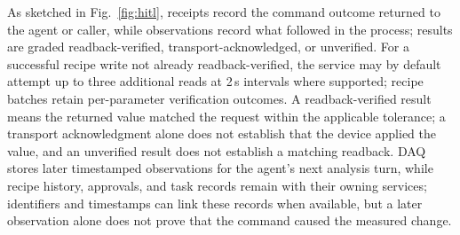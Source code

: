As sketched in Fig.~\ref{fig:hitl}, receipts record the command outcome returned to the agent or caller, while observations record what followed in the process; results are graded readback-verified, transport-acknowledged, or unverified. For a successful recipe write not already readback-verified, the service may by default attempt up to three additional reads at 2\,s intervals where supported; recipe batches retain per-parameter verification outcomes. A readback-verified result means the returned value matched the request within the applicable tolerance; a transport acknowledgment alone does not establish that the device applied the value, and an unverified result does not establish a matching readback. DAQ stores later timestamped observations for the agent's next analysis turn, while recipe history, approvals, and task records remain with their owning services; identifiers and timestamps can link these records when available, but a later observation alone does not prove that the command caused the measured change.

